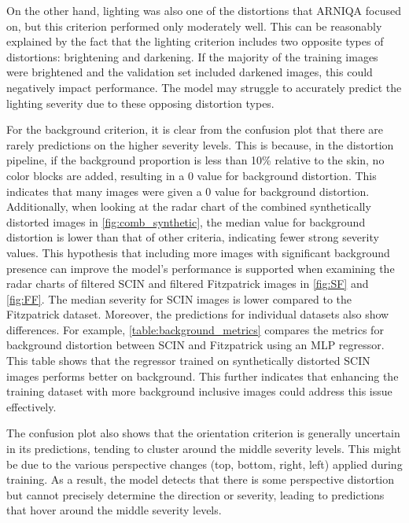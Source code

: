 \vspace{\baselineskip}
\noindent
On the other hand, lighting was also one of the distortions that ARNIQA focused on, but this criterion performed only moderately well. This can be reasonably explained by the fact that the lighting criterion includes two opposite types of distortions: brightening and darkening. If the majority of the training images were brightened and the validation set included darkened images, this could negatively impact performance. The model may struggle to accurately predict the lighting severity due to these opposing distortion types.\par
\vspace{\baselineskip}
\noindent
For the background criterion, it is clear from the confusion plot that there are rarely predictions on the higher severity levels. This is because, in the distortion pipeline, if the background proportion is less than 10\% relative to the skin, no color blocks are added, resulting in a 0 value for background distortion. This indicates that many images were given a 0 value for background distortion. Additionally, when looking at the radar chart of the combined synthetically distorted images in \autoref{fig:comb_synthetic}, the median value for background distortion is lower than that of other criteria, indicating fewer strong severity values. This hypothesis that including more images with significant background presence can improve the model’s performance is supported when examining the radar charts of filtered SCIN and filtered Fitzpatrick images in \autoref{fig:SF} and \autoref{fig:FF}. The median severity for SCIN images is lower compared to the Fitzpatrick dataset. Moreover, the predictions for individual datasets also show differences. For example, \autoref{table:background_metrics} compares the metrics for background distortion between SCIN and Fitzpatrick using an MLP regressor. This table shows that the regressor trained on synthetically distorted SCIN images performs better on background. This further indicates that enhancing the training dataset with more background inclusive images could address this issue effectively.\par
\vspace{\baselineskip}
\noindent
The confusion plot also shows that the orientation criterion is generally uncertain in its predictions, tending to cluster around the middle severity levels. This might be due to the various perspective changes (top, bottom, right, left) applied during training. As a result, the model detects that there is some perspective distortion but cannot precisely determine the direction or severity, leading to predictions that hover around the middle severity levels.\par
